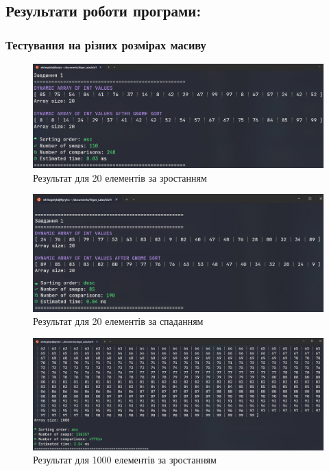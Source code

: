 \clearpage
\subsection{Результати роботи програми:}
\subsubsection{Тестування на різних розмірах масиву}

\begin{figure}[h!]
  \centering
  \includegraphics[width=13cm]{reports/algos/lab11/assets/20a.png}
  \caption{Результат для 20 елементів за зростанням}
\end{figure}

\begin{figure}[h!]
  \centering
  \includegraphics[width=13cm]{reports/algos/lab11/assets/20d.png}
  \caption{Результат для 20 елементів за спаданням}
\end{figure}

\begin{figure}[h!]
  \centering
  \includegraphics[width=13cm]{reports/algos/lab11/assets/1000a.png}
  \caption{Результат для 1000 елементів за зростанням}
\end{figure}

